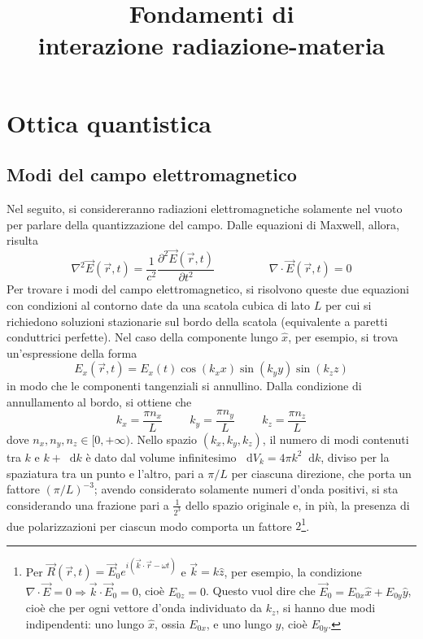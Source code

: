 \documentclass[11pt, a4paper]{scrartcl}
\title{Fondamenti di\\ \vspace{.15cm} interazione radiazione-materia}
\author{}
\date{}
\theoremstyle{style}
\renewcommand{\maketitle}{
\begin{center}
{\sffamily
{\fontsize{20}{20}\selectfont\MakeUppercase\thetitle}}

\vspace{0.2in}

{\large\scshape\sffamily\theauthor}
\end{center}
}
\newcommand{\dd}{\mathop{}\!\mathrm{d}}
\numberwithin{equation}{subsection}
\begin{document}
\maketitle
\newpage
\tableofcontents 
\newpage
\section{Ottica quantistica}

\subsection{Modi del campo elettromagnetico}

Nel seguito, si considereranno radiazioni elettromagnetiche solamente nel vuoto per parlare della quantizzazione del campo.
Dalle equazioni di Maxwell, allora, risulta
\begin{equation}
	\nabla ^2 \vec{E}(\vec{r},t) = \frac{1}{c^2} \frac{\partial ^2 \vec{E}(\vec{r},t)}{\partial t^2}  \hspace{2cm} \nabla \cdot \vec{E}(\vec{r},t) = 0
\end{equation}
Per trovare i modi del campo elettromagnetico, si risolvono queste due equazioni con condizioni al contorno date da una scatola cubica di lato $L$ per cui si richiedono soluzioni stazionarie sul bordo della scatola (equivalente a paretti conduttrici perfette).
Nel caso della componente lungo $\hat{x}$, per esempio, si trova un'espressione della forma 
\begin{equation}
	E_x(\vec{r},t) = E_x(t) \cos (k_x x ) \sin (k_y y ) \sin(k_z z)
\end{equation}
in modo che le componenti tangenziali si annullino.
Dalla condizione di annullamento al bordo, si ottiene che 
\begin{equation}
	k_x = \frac{\pi n_x}{L} \hspace{1cm} k_y = \frac{\pi n_y}{L} \hspace{1cm} k_z = \frac{\pi n_z}{L}
\end{equation}
dove $n_x,n_y,n_z \in [0,+\infty)$.
Nello spazio $(k_x,k_y,k_z)$, il numero di modi contenuti tra $k$ e $k +\dd k$ \`e dato dal volume infinitesimo $\dd V_k = 4 \pi k^2 \dd k$, diviso per la spaziatura tra un punto e l'altro, pari a $\pi / L$ per ciascuna direzione, che porta un fattore $(\pi / L ) ^{-3}$; avendo considerato solamente numeri d'onda positivi, si sta considerando una frazione pari a $\frac{1}{2^3}$ dello spazio originale e, in pi\`u, la presenza di due polarizzazioni per ciascun modo comporta un fattore $2$\footnote{Per $\vec{R}(\vec{r},t) = \vec{E}_0 e^{i (\vec{k}\cdot \vec{r}-\omega t)}$ e $\vec{k} = k \hat{z}$, per esempio, la condizione $\nabla \cdot \vec{E} = 0 \Rightarrow  \vec{k} \cdot \vec{E}_0 = 0$,  cio\`e $E_{0z}=0$. Questo vuol dire che $\vec{E}_0 = E_{0x}\hat{x} + E_{0y}\hat{y}$, cio\`e che per ogni vettore d'onda individuato da $k_z$, si hanno due modi indipendenti: uno lungo $\hat{x}$, ossia $E_{0x}$, e uno lungo $\hat{y}$, cio\`e $E_{0y}$.}.
\end{document}
